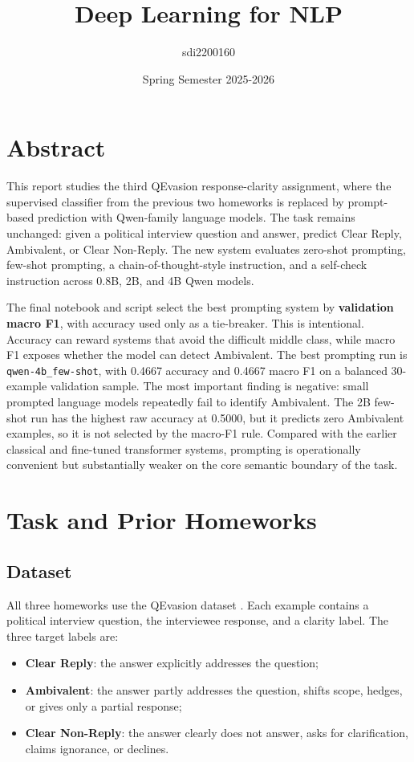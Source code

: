 \documentclass[12pt]{fphw}
\title{Deep Learning for NLP}
\author{sdi2200160}
\date{Spring Semester 2025-2026}
\institute{National and Kapodistrian University of Athens \\ Department of Informatics and Telecommunications}
\newcommand{\CR}{Clear Reply}
\newcommand{\AMB}{Ambivalent}
\newcommand{\CNR}{Clear Non-Reply}
\begin{document}
\maketitle

{
  \hypersetup{linkcolor=black}
  \tableofcontents
}
\newpage

\section{Abstract}

This report studies the third QEvasion response-clarity assignment, where the supervised classifier from the previous two homeworks is replaced by prompt-based prediction with Qwen-family language models. The task remains unchanged: given a political interview question and answer, predict \CR, \AMB, or \CNR. The new system evaluates zero-shot prompting, few-shot prompting, a chain-of-thought-style instruction, and a self-check instruction across 0.8B, 2B, and 4B Qwen models.

The final notebook and script select the best prompting system by \textbf{validation macro F1}, with accuracy used only as a tie-breaker. This is intentional. Accuracy can reward systems that avoid the difficult middle class, while macro F1 exposes whether the model can detect \AMB. The best prompting run is \texttt{qwen-4b\_few-shot}, with 0.4667 accuracy and 0.4667 macro F1 on a balanced 30-example validation sample. The most important finding is negative: small prompted language models repeatedly fail to identify \AMB. The 2B few-shot run has the highest raw accuracy at 0.5000, but it predicts zero \AMB{} examples, so it is not selected by the macro-F1 rule. Compared with the earlier classical and fine-tuned transformer systems, prompting is operationally convenient but substantially weaker on the core semantic boundary of the task.

\section{Task and Prior Homeworks}

\subsection{Dataset}

All three homeworks use the QEvasion dataset \cite{qevasion}. Each example contains a political interview question, the interviewee response, and a clarity label. The three target labels are:
\begin{itemize}
    \item \textbf{\CR}: the answer explicitly addresses the question;
    \item \textbf{\AMB}: the answer partly addresses the question, shifts scope, hedges, or gives only a partial response;
    \item \textbf{\CNR}: the answer clearly does not answer, asks for clarification, claims ignorance, or declines.
\end{itemize}
\end{document}
